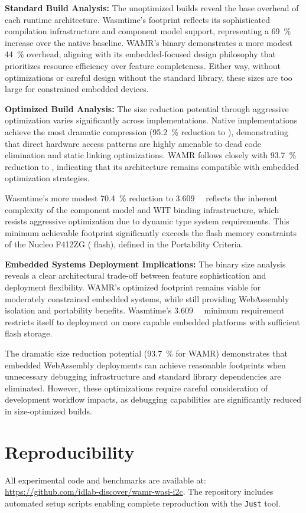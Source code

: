 \textbf{Standard Build Analysis:} The unoptimized builds reveal the base overhead of each runtime architecture. Wasmtime's  footprint reflects its sophisticated compilation infrastructure and component model support, representing a \SI[round-precision=1]{69}{\percent} increase over the native baseline. WAMR's  binary demonstrates a more modest \SI[round-precision=1]{44}{\percent} overhead, aligning with its embedded-focused design philosophy that prioritizes resource efficiency over feature completeness. Either way, without optimizations or careful design without the standard library, these sizes are too large for constrained embedded devices.

\textbf{Optimized Build Analysis:} The size reduction potential through aggressive optimization varies significantly across implementations. Native implementations achieve the most dramatic compression (\SI[round-precision=1]{95.2}{\percent} reduction to ), demonstrating that direct hardware access patterns are highly amenable to dead code elimination and static linking optimizations. WAMR follows closely with \SI[round-precision=1]{93.7}{\percent} reduction to , indicating that its architecture remains compatible with embedded optimization strategies.

Wasmtime's more modest \SI[round-precision=1]{70.4}{\percent} reduction to \SI{3.609}{\mega\byte} reflects the inherent complexity of the component model and WIT binding infrastructure, which resists aggressive optimization due to dynamic type system requirements. This minimum achievable footprint significantly exceeds the flash memory constraints of the Nucleo F412ZG ( flash), defined in the Portability Criteria.

\textbf{Embedded Systems Deployment Implications:} The binary size analysis reveals a clear architectural trade-off between feature sophistication and deployment flexibility. WAMR's optimized  footprint remains viable for moderately constrained embedded systems, while still providing WebAssembly isolation and portability benefits. Wasmtime's \SI{3.609}{\mega\byte} minimum requirement restricts itself to deployment on more capable embedded platforms with sufficient flash storage.

The dramatic size reduction potential (\SI[round-precision=1]{93.7}{\percent} for WAMR) demonstrates that embedded WebAssembly deployments can achieve reasonable footprints when unnecessary debugging infrastructure and standard library dependencies are eliminated. However, these optimizations require careful consideration of development workflow impacts, as debugging capabilities are significantly reduced in size-optimized builds.

\section*{Reproducibility}
All experimental code and benchmarks are available at: \url{https://github.com/idlab-discover/wamr-wasi-i2c}. The repository includes automated setup scripts enabling complete reproduction with the \texttt{Just} tool.